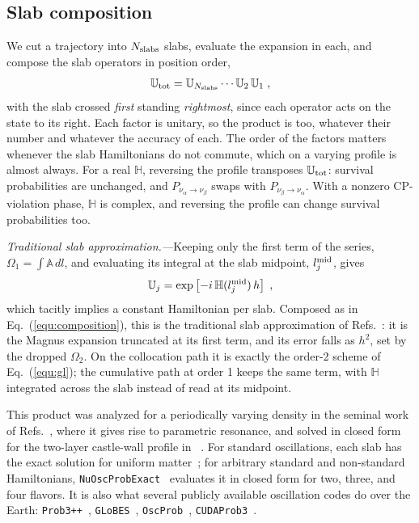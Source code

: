 \documentclass[final,5p,times,twocolumn,sort,compress]{elsarticle}
\makeatletter
\newcommand{\eq}{Eq.}
\DeclareRobustCommand{\_}{%
  \ifmmode\nfss@text{\textunderscore}\else\textunderscore\allowbreak\fi}
\providecommand{\Ref}{}
\newcommand{\Refs}{Refs.}
\newcommand{\equ}[1]{\eq~(\ref{equ:#1})}
\makeatother
\begin{document}

\subsection{Slab composition}
\label{sec:order_is_the_slab_product}

We cut a trajectory into $N_{\rm slabs}$ slabs, evaluate the expansion in each, and compose the slab operators in position order,
\begin{equation}
 \label{equ:composition}
 \mathbb{U}_{\rm tot}
 =
 \mathbb{U}_{N_{\rm slabs}} \cdots \mathbb{U}_2\, \mathbb{U}_1 \;,
\end{equation}
with the slab crossed \emph{first} standing \emph{rightmost}, since each operator acts on the state to its right. Each factor is unitary, so the product is too, whatever their number and whatever the accuracy of each. The order of the factors matters whenever the slab Hamiltonians do not commute, which on a varying profile is almost always. For a real $\mathbb{H}$, reversing the profile transposes $\mathbb{U}_{\rm tot}$: survival probabilities are unchanged, and $P_{\nu_\alpha \to \nu_\beta}$ swaps with $P_{\nu_\beta \to \nu_\alpha}$. With a nonzero CP-violation phase, $\mathbb{H}$ is complex, and reversing the profile can change survival probabilities too.

\smallskip

\textit{Traditional slab approximation.---}Keeping only the first term of the series, $\Omega_1 = \int \mathbb{A}\,dl$, and evaluating its integral at the slab midpoint, $l_j^{\rm mid}$, gives
\begin{equation}
 \label{equ:slab_approx}
 \mathbb{U}_j = \exp\left[-i\,\mathbb{H}(l_j^{\rm mid})\,h\right] \;,
\end{equation}
which tacitly implies a constant Hamiltonian per slab. Composed as in \equ{composition}, this is the traditional slab approximation of \Refs~\cite{Akhmedov:1988kd, Krastev:1989ix, Akhmedov:1998ui}: it is the Magnus expansion truncated at its first term, and its error falls as $h^2$, set by the dropped $\Omega_2$. On the collocation path it is exactly the order-2 scheme of \equ{gl}; the cumulative path at order 1 keeps the same term, with $\mathbb{H}$ integrated across the slab instead of read at its midpoint.

This product was analyzed for a periodically varying density in the seminal work of \Refs\ \cite{Akhmedov:1988kd, Krastev:1989ix}, where it gives rise to parametric resonance, and solved in closed form for the two-layer castle-wall profile in \Ref\ \cite{Akhmedov:1998ui}. For standard oscillations, each slab has the exact solution for uniform matter\ \cite{Ohlsson:1999xb}; for arbitrary standard and non-standard Hamiltonians, {\tt NuOscProbExact}\ \cite{Bustamante:2019ggq, NuOscProbExact} evaluates it in closed form for two, three, and four flavors. It is also what several publicly available oscillation codes do over the Earth: {\tt Prob3++}\ \cite{Prob3pp}, {\tt GLoBES}\ \cite{GLoBES}, {\tt OscProb}\ \cite{OscProb}, {\tt CUDAProb3}\ \cite{Kallenborn:2019ilo}.
\end{document}
